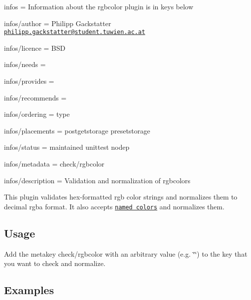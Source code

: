 
\begin{DoxyItemize}
\item infos = Information about the rgbcolor plugin is in keys below
\item infos/author = Philipp Gackstatter \href{mailto:philipp.gackstatter@student.tuwien.ac.at}{\tt philipp.\+gackstatter@student.\+tuwien.\+ac.\+at}
\item infos/licence = B\+SD
\item infos/needs =
\item infos/provides =
\item infos/recommends =
\item infos/ordering = type
\item infos/placements = postgetstorage presetstorage
\item infos/status = maintained unittest nodep
\item infos/metadata = check/rgbcolor
\item infos/description = Validation and normalization of rgbcolors
\end{DoxyItemize}

This plugin validates hex-\/formatted rgb color strings and normalizes them to decimal rgba format. It also accepts \href{https://www.w3.org/TR/css-color-3/#svg-color}{\tt named colors} and normalizes them.

\subsection*{Usage}

Add the metakey {\ttfamily check/rgbcolor} with an arbitrary value (e.\+g. {\ttfamily \char`\"{}\char`\"{}}) to the key that you want to check and normalize.

\subsection*{Examples}


